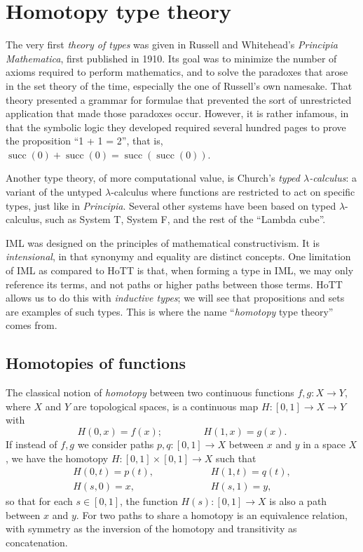 \documentclass{article}
\newcommand{\1}{\textbf{1}}
\newcommand{\0}{\mathbf{0}}
\newcommand{\2}{\textbf{2}}
\renewcommand{\succ}{\operatorname{succ}}
\begin{document}
\section{Homotopy type theory}
The very first \emph{theory of types} was given in Russell and Whitehead's \emph{Principia Mathematica}, first published in 1910. Its goal was to minimize the number of axioms required to perform mathematics, and to solve the paradoxes that arose in the set theory of the time, especially the one of Russell's own namesake. That theory presented a grammar for formulae that prevented the sort of unrestricted application that made those paradoxes occur. However, it is rather infamous, in that the symbolic logic they developed required several hundred pages to prove the proposition ``1 + 1 = 2'', that is, \( \succ(0) + \succ(0) = \succ(\succ(0)) \). 

Another type theory, of more computational value, is Church's \emph{typed \( \lambda \)-calculus}: a variant of the untyped \( \lambda \)-calculus where functions are restricted to act on specific types, just like in \emph{Principia}. Several other systems have been based on typed \( \lambda \)-calculus, such as System T, System F, and the rest of the ``Lambda cube''.

IML was designed on the principles of mathematical constructivism. It is \emph{intensional}, in that synonymy and equality are distinct concepts. One limitation of IML as compared to HoTT is that, when forming a type in IML, we may only reference its terms, and not paths or higher paths between those terms. HoTT allows us to do this with \emph{inductive types}; we will see that propositions and sets are examples of such types. This is where the name ``\emph{homotopy} type theory'' comes from.
\subsection{Homotopies of functions}
The classical notion of \emph{homotopy} between two continuous functions \( f, g : X \to Y \), where \( X \) and \( Y \) are topological spaces, is a continuous map \( H : [0, 1] \to X \to Y \) with
\[ H(0, x) = f(x); \hspace{50pt} H(1, x) = g(x). \]
If instead of \( f, g \) we consider paths \( p, q : [0, 1] \to X \) between \( x \) and \( y \) in a space \( X \), we have the homotopy \( H : [0, 1] \times [0, 1] \to X \) such that
\[ \begin{array}{ccc}
	H(0, t) = p(t), &\hspace{50pt}& H(1, t) = q(t), \\
	H(s, 0) = x, && H(s, 1) = y,
\end{array} \]
so that for each \( s \in [0, 1] \), the function \( H(s) : [0, 1] \to X \) is also a path between \( x \) and \( y \). For two paths to share a homotopy is an equivalence relation, with symmetry as the inversion of the homotopy and transitivity as concatenation.
\end{document}
